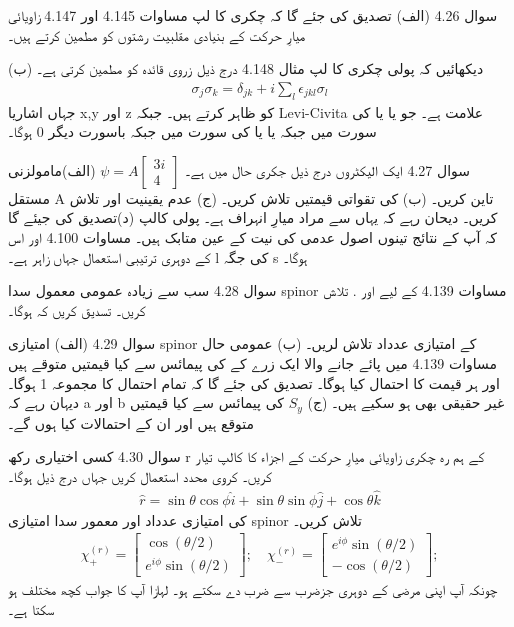 سوال 4.26
(الف) تصدیق کی جئے گا کہ چکری کا لپ مساوات 4.145 اور 4.147 زاویائی میارِ حرکت کے بنیادی مقلبیت رشتوں  کو مطمین کرتے ہیں۔ 

(ب) دیکھائیں کہ پولی چکری کا لپ  مثال  4.148 درج ذیل زروی قائدہ کو مطمین کرتی ہے۔ 
\begin{align}
\sigma_j\sigma_k = \delta_{jk}+i\sum_l \epsilon_{jkl}\sigma_l
\end{align}
جہاں اشاریا x,y اور z کو ظاہر کرتے ہیں۔ جبکہ  
Levi-Civita
 علامت ہے۔ جو 
یا 
یا  
کی سورت میں 
جبکہ  
یا
یا
کی سورت میں 
جبکہ باسورت دیگر
0
ہوگا۔ 

سوال 
4.27
ایک الیکٹروں درج ذیل جکری حال میں ہے۔
$\psi =A\begin{bmatrix}
3i \\ 4
\end{bmatrix} $
(الف)مامولزنی مستقل A تاین کریں۔
 (ب)  کی تقواتی قیمتیں تلاش کریں۔
 (ج) عدم یقینیت     اور
   تلاش کریں۔ دیحان رہے کہ یہاں  سے مراد میارِ انہراف ہے۔ پولی کالپ 
  (د)تصدیق کی جیئے گا کہ آپ کے نتائج تینوں اصول عدمی کی نیت کے عین متابک ہیں۔ مساوات   4.100 اور اس کے دوہری ترتیبی استعمال جہاں زاہر ہے۔
   l
کی جگہ
   s
   ہوگا۔
   
   سوال  4.28  سب سے زیادہ عمومی معمول سدا spinor    مساوات 4.139  کے لیے 
   اور
   .
 تلاش کریں۔ تسدیق کریں کہ 
 ہوگا۔ 
 
 سوال 
 4.29
 (الف)  امتیازی spinor 
کے امتیازی عدداد تلاش لریں۔
(ب) عمومی حال  مساوات 
4.139
 میں پائے جانے والا ایک زرے کے 
کی پیمائس سے کیا قیمتیں متوقے ہیں اور ہر قیمت کا احتمال کیا ہوگا۔ تصدیق کی جئے گا کہ تمام احتمال کا مجموعہ  1 ہوگا۔ دیہان رہے کہ a اور b غیر حقیقی بھی ہو سکیے ہیں۔  
(ج) $S_y$ کی پیمائس سے کیا قیمتیں متوقع ہیں اور ان کے احتمالات کیا ہوں گے۔ 

سوال 
4.30
کسی اختیاری رکھ r کے ہم رہ چکری زاویائی میارِ حرکت کے اجزاء کا کالپ 
تیار کریں۔ کروی محدد استعمال کریں جہاں درج ذیل ہوگا۔
\begin{align}
\hat{r} = \sin\theta \cos\phi \hat{i} + \sin\theta \sin\phi \hat{j} + \cos\theta \hat{k}
\end{align}
کی امتیازی عدداد اور معمور سدا امتیازی spinor
تلاش کریں۔
\begin{align}
\chi_{+}^{(r)} = \begin{bmatrix} \cos(\theta/2)\\ e^{i\phi}\sin(\theta/2)\end{bmatrix};
\quad
\chi_{-}^{(r)} = \begin{bmatrix} e^{i\phi}\sin(\theta/2)\\ -\cos(\theta/2)\end{bmatrix};
\end{align}
چونکہ آپ اپنی مرضی کے دوہری جزضرب 
سے ضرب دے سکتے ہو۔ لہازا آپ کا جواب کچھ مختلف ہو سکتا ہے۔ 

